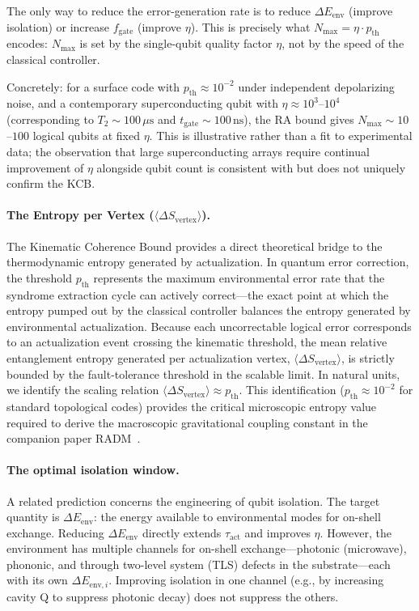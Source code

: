 \documentclass[11pt,a4paper]{article}
\theoremstyle{plain}
\theoremstyle{definition}
\theoremstyle{remark}
\begin{document}
The only way to reduce the
error-generation rate is to reduce $\Delta E_{\mathrm{env}}$ (improve isolation)
or increase $f_{\mathrm{gate}}$ (improve $\eta$). This is precisely what
$N_{\max} = \eta \cdot p_{\mathrm{th}}$ encodes: $N_{\max}$ is set by the
single-qubit quality factor $\eta$, not by the speed of the classical controller.

Concretely: for a surface code with $p_{\mathrm{th}} \approx 10^{-2}$ under
independent depolarizing noise, and a contemporary superconducting qubit with
$\eta \approx 10^3$--$10^4$ (corresponding to $T_2 \sim 100\,\mu\mathrm{s}$ and
$t_{\mathrm{gate}} \sim 100\,\mathrm{ns}$), the RA bound gives
$N_{\max} \sim 10$--$100$ logical qubits at fixed $\eta$. This is illustrative
rather than a fit to experimental data; the observation that large superconducting
arrays require continual improvement of $\eta$ alongside qubit count is consistent
with but does not uniquely confirm the KCB.

\paragraph{The Entropy per Vertex ($\langle\Delta S_{\mathrm{vertex}}\rangle$).}
The Kinematic Coherence Bound provides a direct theoretical bridge to the thermodynamic entropy generated by actualization. In quantum error correction, the threshold $p_{\mathrm{th}}$ represents the maximum environmental error rate that the syndrome extraction cycle can actively correct---the exact point at which the entropy pumped out by the classical controller balances the entropy generated by environmental actualization. Because each uncorrectable logical error corresponds to an actualization event crossing the kinematic threshold, the mean relative entanglement entropy generated per actualization vertex, $\langle\Delta S_{\mathrm{vertex}}\rangle$, is strictly bounded by the fault-tolerance threshold in the scalable limit. In natural units, we identify the scaling relation $\langle\Delta S_{\mathrm{vertex}}\rangle \approx p_{\mathrm{th}}$. This identification ($p_{\mathrm{th}} \approx 10^{-2}$ for standard topological codes) provides the critical microscopic entropy value required to derive the macroscopic gravitational coupling constant in the companion paper RADM~\citep{Sandeman2026RADM}.

\paragraph{The optimal isolation window.}
A related prediction concerns the engineering of qubit isolation. The target
quantity is $\Delta E_{\mathrm{env}}$: the energy available to environmental modes
for on-shell exchange. Reducing $\Delta E_{\mathrm{env}}$ directly extends
$\tau_{\mathrm{act}}$ and improves $\eta$. However, the environment has multiple
channels for on-shell exchange---photonic (microwave), phononic, and through
two-level system (TLS) defects in the substrate---each with its own $\Delta
E_{\mathrm{env}, i}$. Improving isolation in one channel (e.g., by increasing
cavity Q to suppress photonic decay) does not suppress the others.
\end{document}
